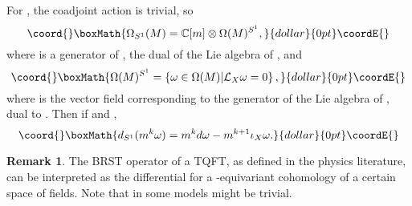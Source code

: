\documentclass[a4paper,12pt,reqno,sumlimits]{amsart}
\theoremstyle{plain}
\theoremstyle{definition}
\newtheorem{rem}[thm]{Remark}
\providecommand{\C}{{\mathbb C}}
\providecommand{\Z}{{\mathbb Z}}
\providecommand{\1}{{\bf 1}}
\providecommand{\uu}{{\mathfrak  u}}
\providecommand{\calL}{{\mathcal L}}
\numberwithin{equation}{section}
\begin{document}
For \coordHE{}, the coadjoint action is trivial, so
$$\coord{}\boxMath{
\Omega_{S^1}(M)=\C[m]\otimes\Omega(M)^{S^1},
}{dollar}{0pt}\coordE{}$$
where \coordHE{} is a generator of \myHighlight{$\uu(1)^*$}\coordHE{}, the dual of the Lie algebra of
\coordHE{}, and
$$\coord{}\boxMath{
\Omega(M)^{S^1}=\left\{\omega\in\Omega(M)|\calL_X\omega=0\right\},
}{dollar}{0pt}\coordE{}$$
where
\coordHE{} is the vector field corresponding to the generator of the Lie algebra
of \coordHE{}, dual to \coordHE{}.  Then if \coordHE{} and \myHighlight{$k\in\Z$}\coordHE{},
$$\coord{}\boxMath{
d_{S^1}(m^k\omega)=m^k d\omega - m^{k+1}\iota_X\omega.
}{dollar}{0pt}\coordE{}$$

\begin{rem}
  The BRST operator of a TQFT, as defined in the physics literature, can be
  interpreted as the differential \coordHE{} for a \coordHE{}-equivariant cohomology of a
  certain space of fields. Note that in some models \coordHE{} might be trivial.
\end{rem}
\end{document}
